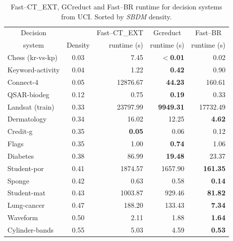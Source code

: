 \documentclass[number,preprint,review,12pt]{elsarticle}
\begin{document}
	\begin{table}[htb]
		\centering
		\caption{Fast--CT\_EXT, GCreduct and Fast--BR runtime for decision systems from UCI. Sorted by \textit{SBDM} density.}
		\label{tab:density}
		\begin{tabular}{|l|c|r|r|r|}
			\hline
			\multicolumn{1}{|c|}{Decision}  && Fast--CT\_EXT & \multicolumn{1}{c|}{Gcreduct} & \multicolumn{1}{c|}{Fast--BR}  \\
			\multicolumn{1}{|c|}{system}       & Density & runtime (s) & runtime (s)  & runtime (s)  \\
			\hline
			Chess (kr-vs-kp)          & 0.03    & 7.45          & \textbf{$<$0.01} & 0.02            \\
			Keyword-activity          & 0.04    & 1.22          & \textbf{0.42}    & 0.90            \\
			Connect-4                 & 0.05    & 12876.67      & \textbf{44.23}   & 160.61          \\
			QSAR-biodeg               & 0.12    & 0.75          & \textbf{0.19}    & 0.33            \\
			Landsat (train)           & 0.33    & 23797.99      & \textbf{9949.31} & 17732.49        \\
			Dermatology               & 0.34    & 16.02         & 12.25            & \textbf{4.62}   \\
			Credit-g                  & 0.35    & \textbf{0.05} & 0.06             & 0.12            \\
			Flags                     & 0.35    & 1.00          & \textbf{0.74}    & 1.06            \\
			Diabetes                  & 0.38    & 86.99         & \textbf{19.48}   & 23.37           \\
			Student-por               & 0.41    & 1874.57       & 1657.90          & \textbf{161.35} \\
			Sponge                    & 0.42    & 0.63          & 0.58             & \textbf{0.14}   \\
			Student-mat               & 0.43    & 1003.87       & 929.46           & \textbf{81.82}  \\
			Lung-cancer               & 0.47    & 188.20        & 133.43           & \textbf{7.34}   \\
			Waveform                  & 0.50    & 2.11          & 1.88             & \textbf{1.64}   \\
			Cylinder-bands            & 0.55    & 5.03          & 4.59             & \textbf{0.53}   \\
			\hline
		\end{tabular}
	\end{table}
	
\end{document}
